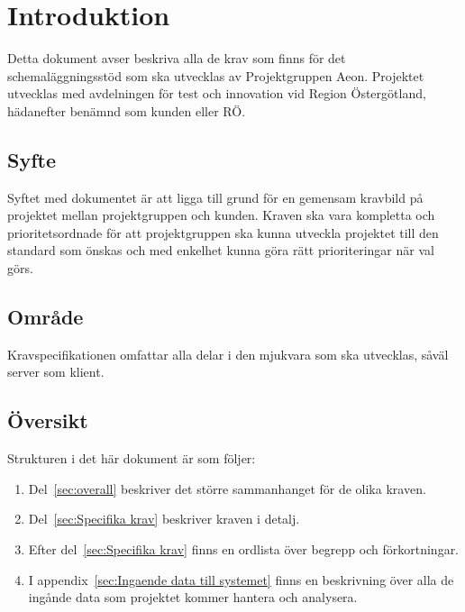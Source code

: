 \documentclass[twoside]{article}
\begin{document}
\def\ftitle{Kravspecifikation}
\def\fversion{1.3}




\section{Introduktion}
Detta dokument avser beskriva alla de krav som finns för det schemaläggningsstöd
som ska utvecklas av Projektgruppen Aeon. Projektet utvecklas med avdelningen för test
och innovation vid Region Östergötland, hädanefter benämnd som kunden eller RÖ.

\subsection{Syfte}
Syftet med dokumentet är att ligga till grund för en gemensam kravbild på
projektet mellan projektgruppen och kunden. Kraven ska vara kompletta och
prioritetsordnade för att projektgruppen ska kunna utveckla projektet till den
standard som önskas och med enkelhet kunna göra rätt prioriteringar när val görs.

\subsection{Område}
Kravspecifikationen omfattar alla delar i den mjukvara som ska utvecklas, såväl
server som klient.

\subsection{Översikt}
Strukturen i det här dokument är som följer:

\begin{enumerate}
\item Del~\ref{sec:overall} beskriver det större sammanhanget för de olika
kraven.
\item Del~\ref{sec:Specifika krav} beskriver kraven i detalj.
\item Efter del~\ref{sec:Specifika krav} finns en ordlista över begrepp och
förkortningar.
\item I appendix~\ref{sec:Ingaende data till systemet} finns en beskrivning
över alla de ingånde data som projektet kommer hantera och analysera.

\end{enumerate}

\end{document}
